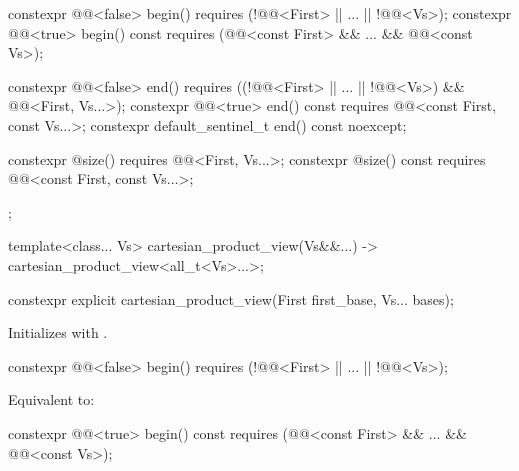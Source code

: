 \begin{codeblock}
{{    constexpr @@<false> begin()
      requires (!@@<First> || ... || !@@<Vs>);
    constexpr @@<true> begin() const
      requires (@@<const First> && ... && @@<const Vs>);

    constexpr @@<false> end()
      requires ((!@@<First> || ... || !@@<Vs>) &&
        @@<First, Vs...>);
    constexpr @@<true> end() const
      requires @@<const First, const Vs...>;
    constexpr default_sentinel_t end() const noexcept;

    constexpr @\seebelow@ size()
      requires @@<First, Vs...>;
    constexpr @\seebelow@ size() const
      requires @@<const First, const Vs...>;
  };

  template<class... Vs>
    cartesian_product_view(Vs&&...) -> cartesian_product_view<all_t<Vs>...>;
}
\end{codeblock}

\begin{itemdecl}
constexpr explicit cartesian_product_view(First first_base, Vs... bases);
\end{itemdecl}

\begin{itemdescr}
\pnum
\effects
Initializes 
with .
\end{itemdescr}

\begin{itemdecl}
constexpr @@<false> begin()
  requires (!@@<First> || ... || !@@<Vs>);
\end{itemdecl}

\begin{itemdescr}
\pnum
\effects
Equivalent to:
\end{itemdescr}

\begin{itemdecl}
constexpr @@<true> begin() const
  requires (@@<const First> && ... && @@<const Vs>);
\end{itemdecl}

